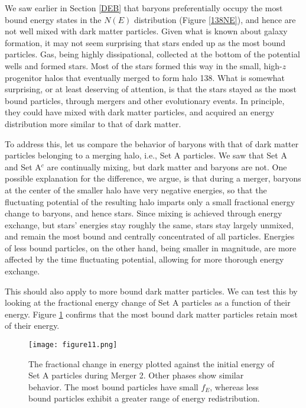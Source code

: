 \documentclass[a4paper,11pt]{article}
\begin{document}
We saw earlier in Section \ref{DEB} that baryons preferentially occupy the most bound energy
states in the $N(E)$ distribution (Figure \ref{138NE}), and hence are not well mixed with dark matter
particles.  Given what is
known about galaxy formation, it may not seem surprising that stars ended up as the
most bound particles.  Gas, being highly dissipational, collected at the bottom of
the potential wells and formed stars. Most of the stars formed this way in the
small, high-$z$ progenitor halos that eventually merged to form halo 138. What is
somewhat surprising, or at least deserving of attention, is that the stars stayed as
the most bound particles, through mergers and other evolutionary events. In
principle, they could have mixed with dark matter particles, and acquired an energy
distribution more similar to that of dark matter.

To address this, let us compare the behavior of baryons with that of dark matter particles belonging to a merging halo, i.e., Set A particles.  We saw that Set A and
Set A$^c$ are continually mixing, but dark matter and baryons are not. One possible explanation for the difference, we
argue, is that during a merger, baryons at the center of the smaller halo have very negative energies, so that the fluctuating potential of the resulting halo 
imparts only a small fractional energy change to baryons, and hence stars.  Since mixing is achieved through energy exchange, but stars' energies stay roughly the same, stars stay largely unmixed, and 
remain the most bound and centrally concentrated of all particles.  Energies of less bound particles, on the other hand, being smaller in magnitude, are more 
affected by the time fluctuating potential, allowing for more thorough energy exchange.

This should also apply to more bound dark matter particles.  We can test this by looking at the fractional energy change of Set A  particles as a function of 
their energy.  Figure \ref{fEvEi} confirms that the most bound dark matter particles retain most of their energy. 

\begin{figure}
\centering
\texttt{[image: figure11.png]}
\caption{The fractional change in energy plotted against the initial energy of Set A particles during Merger 2.  Other phases show similar behavior.  The most bound particles have small $f_E$, 
whereas less bound particles exhibit a greater range of energy redistribution.}
\label{fEvEi}
\end{figure} 
\end{document}
